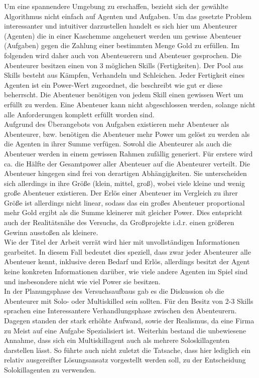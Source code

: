 \documentclass[fleqn,10pt]{article} %
\begin{document}
Um eine spannendere Umgebung zu erschaffen, bezieht sich der gewählte Algorithmus nicht einfach auf Agenten und Aufgaben. Um das gesetzte Problem interessanter und intuitiver darzustellen handelt es sich hier um Abenteurer (Agenten) die in einer Kaschemme angeheuert werden um gewisse Abenteuer (Aufgaben) gegen die Zahlung einer bestimmten Menge Gold zu erfüllen. Im folgenden wird daher auch von Abenteuerern und Abenteuer gesprochen. Die Abenteurer besitzen einen von 3 möglichen Skills (Fertigkeiten). Der Pool aus Skills besteht aus Kämpfen, Verhandeln und Schleichen. Jeder Fertigkeit eines Agenten ist ein Power-Wert zugeordnet, die beschreibt wie gut er diese beherrscht. Die Abenteuer benötigen von jedem Skill einen gewissen Wert um erfüllt zu werden. Eine Abenteuer kann nicht abgeschlossen werden, solange nicht alle Anforderungen komplett erfüllt worden sind.\\
Aufgrund des Überangebots von Aufgaben existieren mehr Abenteuer als Abenteurer, bzw. benötigen die Abenteuer mehr Power um gelöst zu werden als die Agenten in ihrer Summe verfügen. Sowohl die Abenteurer als auch die Abenteuer werden in einem gewissen Rahmen zufällig generiert. Für erstere wird ca. die Hälfte der Gesamtpower aller Abenteuer auf die Abenteurer verteilt. Die Abenteuer hingegen sind frei von derartigen Abhängigkeiten. Sie unterscheiden sich allerdings in ihre Größe (klein, mittel, groß), wobei viele kleine und wenig große Abenteuer existieren. Der Erlös einer Abenteuer im Vergleich zu ihrer Größe ist allerdings nicht linear, sodass das ein großes Abenteuer proportional mehr Gold ergibt als die Summe kleinerer mit gleicher Power. Dies entspricht auch der Realitätsnähe des Versuchs, da Großprojekte i.d.r. einen größeren Gewinn ausstoßen als kleinere.\\
Wie der Titel der Arbeit verrät wird hier mit unvollständigen Informationen gearbeitet. In diesem Fall bedeutet dies speziell, dass zwar jeder Abenteurer alle Abenteuer kennt, inklusive deren Bedarf und Erlös, allerdings besitzt der Agent keine konkreten Informationen darüber, wie viele andere Agenten im Spiel sind und insbesondere nicht wie viel Power sie besitzen.\\ 
In der Planungsphase des Versuchsaufbaus gab es die Diskussion ob die Abenteurer mit Solo- oder Multiskilled sein sollten. Für den Besitz von 2-3 Skills sprachen eine Interessantere Verhandlungsphase zwischen den Abenteurern. Dagegen standen der stark erhöhte Aufwand, sowie der Realismus, da eine Firma zu Meist auf eine Aufgabe Spezialisiert ist. Weiterhin bestand die unbewiesene Annahme, dass sich ein Multiskillagent auch als mehrere Soloskillagenten darstellen lässt. So führte auch nicht zuletzt die Tatsache, dass hier lediglich ein relativ ausgereifter Lösungsansatz vorgestellt werden soll, zu der Entscheidung Solokillagenten zu verwenden. \\
\end{document}
